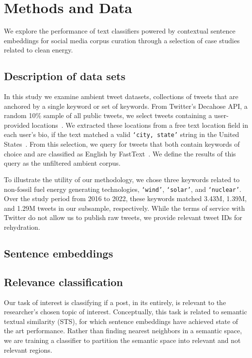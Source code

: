 \section{Methods and Data}
\label{sec:corpusCreation.methods}



We explore the performance of text classifiers
powered by contextual sentence embeddings
for social media corpus curation
through a selection of case studies related to clean energy. 




\subsection{Description of data sets}
\label{sec:corpusCreation.data}

In this study we examine ambient tweet datasets,
collections of tweets that are anchored by a single keyword or set of keywords. 
From Twitter's Decahose API,
a random 10\% sample of all public tweets,
we select tweets containing a user-provided locations~\cite{twitterDecahose}. 
We extracted these locations from a free text location field in each user's bio,
if the text matched a valid 
\texttt{`city, state'} string in the United States~\cite{gray2018english, linnell2021sleep}.
From this selection,
we query for tweets that both contain keywords of choice and are classified as English by FastText~\cite{joulin2017bag}.
We define the results of this query as the unfiltered ambient corpus.

To illustrate the utility of our methodology,
we chose three keywords related to non-fossil fuel energy generating technologies, \texttt{`wind'}, \texttt{`solar'}, and \texttt{`nuclear'}. 
Over the study period from 2016 to 2022,
these keywords matched 3.43M, 1.39M, and 1.29M tweets in our subsample, respectively.
While the terms of service with Twitter do not allow us to publish raw tweets,
we provide relevant tweet IDs for rehydration. 


\subsection{Sentence embeddings}



\subsection{Relevance classification}
Our task of interest is classifying if a post, 
in its entirely,
is relevant to the researcher's chosen topic of interest. 
Conceptually, this task is related to semantic textual similarity (STS), 
for which sentence embeddings have achieved state of the art performance. 
Rather than finding nearest neighbors in a semantic space,
we are training a classifier to partition the semantic space into relevant and not relevant regions.

